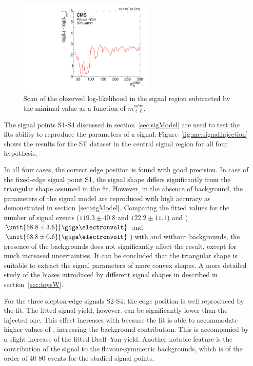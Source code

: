 \begin{figure}[htbp]
\centering
  \includegraphics[width=0.6\textwidth]{plots/results/fit/mcFits/MC.pdf}
\caption{Scan of the observed log-likelihood in the signal region subtracted by the minimal value as a function of $m_{\ell\ell}^{edge}$.}
\label{fig:mc:bgOnlyProfile}
\end{figure}

The signal points S1-S4 discussed in section~\ref{sec:sigModel} are used to test the fits ability to reproduce the parameters of a signal. Figure~\ref{fig:mc:signalInjection} shows the results for the SF dataset in the central signal region for all four hypothesis. 

In all four cases, the correct edge position is found with good precision. In case of the fixed-edge signal point S1, the signal shape differs significantly from the triangular shape assumed in the fit. However, in the absence of background, the parameters of the signal model are reproduced with high accuracy as demonstrated in section~\ref{sec:sigModel}. Comparing the fitted values for the number of signal events ($119.3\pm40.8$ and $122.2\pm11.1$) and \mlledge ($\unit{68.8\pm3.6}{\giga\electronvolt}$ and $\unit{68.8\pm0.6}{\giga\electronvolt}$) with and without backgrounds, the presence of the backgrounds does not significantly affect the result, except for much increased uncertainties. It can be concluded that the triangular shape is suitable to extract the signal parameters of more convex shapes. A more detailed study of the biases introduced by different signal shapes in described in section~\ref{sec:toysW}. 

For the three slepton-edge signals S2-S4, the edge position is well reproduced by the fit. The fitted signal yield, however, can be significantly lower than the injected one. This effect increases with \mlledge because the fit is able to accommodate higher values of \Rsfof, increasing the background contribution. This is accompanied by a slight increase of the fitted Drell--Yan yield. Another notable feature is the contribution of the signal to the flavour-symmetric backgrounds, which is of the order of 40-80 events for the studied signal points.

